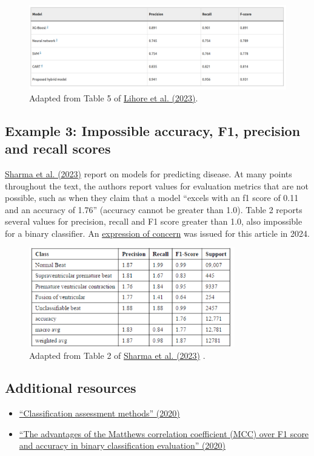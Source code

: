 \documentclass[letterpaper, 12pt]{article}
\begin{document}
\begin{figure}[h!tbp]
    \centering
    \includegraphics[width=\textwidth]{img/classifier_eval/lihore_f1.png}
    \caption*{Adapted from Table 5 of \href{https://doi.org/10.1038/s41598-023-41314-y}{Lihore et al. (2023)}.}
\end{figure}

\subsection*{Example 3: Impossible accuracy, F1, precision and recall scores}

\href{https://doi.org/10.1109/IC3I59117.2023.10397896}{Sharma et al. (2023)} report on models for predicting disease. At many points throughout the text, the authors report values for evaluation metrics that are not possible, such as when they claim that a model ``excels with an f1
score of 0.11 and an accuracy of 1.76'' (accuracy cannot be greater than 1.0). Table 2 reports several values for precision, recall and F1 score greater than 1.0, also impossible for a binary classifier. An \href{https://doi.org/10.1109/IC3I59117.2023.10703725}{expression of concern} was issued for this article in 2024.

\begin{figure}[h!tbp]
    \centering
    \includegraphics[width=0.8\textwidth]{img/classifier_eval/sharma_et_al_table_2.png}
    \caption*{Adapted from Table 2 of \href{https://doi.org/10.1109/IC3I59117.2023.10397896}{Sharma et al. (2023)} .}
\end{figure}

\subsection*{Additional resources}

\begin{itemize}
    \setlength\itemsep{-0.5em}
    \item \href{https://doi.org/10.1016/j.aci.2018.08.003}{``Classification assessment methods'' (2020)}
    \item \href{https://doi.org/10.1186/s12864-019-6413-7}{``The advantages of the Matthews correlation coefficient (MCC) over F1 score and accuracy in binary classification evaluation'' (2020)}
\end{itemize}
\end{document}
